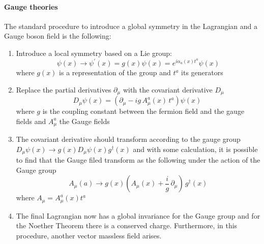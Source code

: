 \paragraph*{Gauge theories}
The standard procedure to introduce a global symmetry in the Lagrangian and a Gauge boson field is the following:
\begin{enumerate}
    \item Introduce a local symmetry based on a Lie group:
    \begin{equation}\label{eq:spinor_gauge}
        \psi(x) \to \psi^\prime (x)=g(x) \psi(x) = e^{i \alpha_a(x) t^a}\psi(x)
    \end{equation}
    where $g(x)$ is a representation of the group and $t^a$ its generators
    \item Replace the partial derivatives $\partial_\mu$ with the covariant derivative $D_\mu$
    \begin{equation}\label{eq:covariant_derivative}
        D_{\mu}\psi(x)=\left(\partial_{\mu}-i g\,A_{\mu}^{a}(x)\,t^{a}\right)\psi(x)\;
    \end{equation}
    where $g$ is the coupling constant between the fermion field and the gauge fields and $A^a_\mu$ the Gauge fields 
    \item The covariant derivative should transform according to the gauge group $D_\mu \psi(x)\to g(x) D_\mu \psi(x)g^\dagger (x)$ and with some calculation, it is possible to find that the Gauge filed transform as the following under the action of the Gauge group
    \begin{equation}\label{eq:gauge_field_transformation}
        A_{\mu}(a)\rightarrow g(x)\left(A_{\mu}(x)+\frac i g\,\partial_{\mu}\right)\,g^{\dagger}(x)
    \end{equation}
    where $A_\mu=A_\mu^a(x)t^a$
    \item The final Lagrangian now has a global invariance for the Gauge group and for the Noether Theorem there is a conserved charge. Furthermore, in this procedure, another vector massless field arises.
\end{enumerate}
